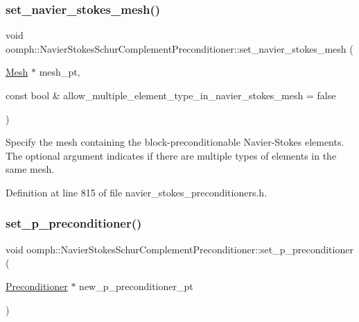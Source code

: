 \subsubsection{\texorpdfstring{set\+\_\+navier\+\_\+stokes\+\_\+mesh()}{set\_navier\_stokes\_mesh()}}
{\footnotesize\ttfamily void oomph\+::\+Navier\+Stokes\+Schur\+Complement\+Preconditioner\+::set\+\_\+navier\+\_\+stokes\+\_\+mesh (\begin{DoxyParamCaption}\item[{\hyperlink{classoomph_1_1Mesh}{Mesh} $\ast$}]{mesh\+\_\+pt,  }\item[{const bool \&}]{allow\+\_\+multiple\+\_\+element\+\_\+type\+\_\+in\+\_\+navier\+\_\+stokes\+\_\+mesh = {\ttfamily false} }\end{DoxyParamCaption})\hspace{0.3cm}{\ttfamily [inline]}}

Specify the mesh containing the block-\/preconditionable Navier-\/\+Stokes elements. The optional argument indicates if there are multiple types of elements in the same mesh. 

Definition at line 815 of file navier\+\_\+stokes\+\_\+preconditioners.\+h.

\mbox{\label{classoomph_1_1NavierStokesSchurComplementPreconditioner_a48f0d5e878eccab6e7f080c92d4bc6f5}} 
\subsubsection{\texorpdfstring{set\+\_\+p\+\_\+preconditioner()}{set\_p\_preconditioner()}}
{\footnotesize\ttfamily void oomph\+::\+Navier\+Stokes\+Schur\+Complement\+Preconditioner\+::set\+\_\+p\+\_\+preconditioner (\begin{DoxyParamCaption}\item[{\hyperlink{classoomph_1_1Preconditioner}{Preconditioner} $\ast$}]{new\+\_\+p\+\_\+preconditioner\+\_\+pt }\end{DoxyParamCaption})\hspace{0.3cm}{\ttfamily [inline]}}



